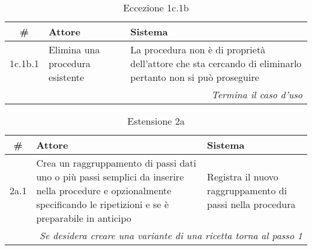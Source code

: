 \begin{table}[H]\centering\color{red}\caption*{Eccezione 1c.1b}
      \small
      \begin{tabular}{|c|p{7cm}|p{5.8cm}|}
            \hline\bfseries \# & \bfseries Attore                & \bfseries Sistema                                                                                         \\\hline
            1c.1b.1            & Elimina una procedura esistente & La procedura non è di proprietà dell’attore che sta cercando di eliminarlo pertanto non si può proseguire \\\hline
            \multicolumn{3}{|r|}{\textit{Termina il caso d'uso}}                                                                                                             \\\hline
      \end{tabular}
\end{table}

\begin{table}[H]\centering\caption*{Estensione 2a}
      \small
      \begin{tabular}{|c|p{7cm}|p{6.24cm}|}
            \hline\bfseries \# & \bfseries Attore                                                                                                                                                                   & \bfseries Sistema                                         \\\hline
            2a.1               & Crea un raggruppamento di passi dati uno o più passi semplici da inserire nella procedure e opzionalmente specificando le ripetizioni e se è preparabile in anticipo & Registra il nuovo raggruppamento di passi nella procedura \\\hline
            \multicolumn{3}{|r|}{\textit{Se desidera creare una variante di una ricetta torna al passo 1}}                                                                                                                                                                      \\\hline
      \end{tabular}
\end{table}

